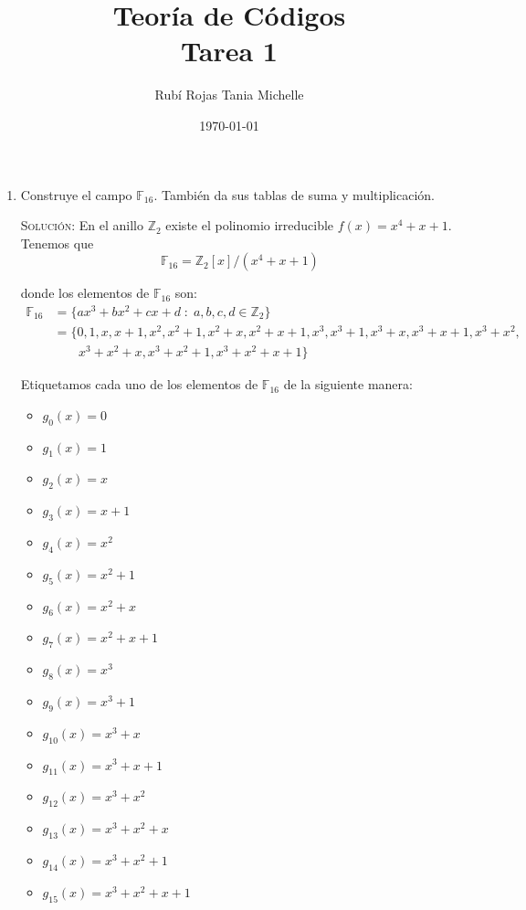 \documentclass[letterpaper,10pt]{article}
\title{Teoría de Códigos \\ Tarea 1}
\author{Rubí Rojas Tania Michelle}
\date{\today}
\begin{document}
\maketitle

\begin{enumerate}
    \item Construye el campo $\mathbb{F}_{16}$. También da sus tablas de suma y 
    multiplicación.
    
    \textsc{Solución:} En el anillo $\mathbb{Z}_{2}$ existe el polinomio 
    irreducible $f(x) = x^{4}+x+1$. Tenemos que 
    \begin{equation}
        \mathbb{F}_{16} = \mathbb{Z}_{2}[x]/(x^{4}+x+1)
    \end{equation}
    
    donde los elementos de $\mathbb{F}_{16}$ son:
    \begin{align*}
        \mathbb{F}_{16} 
        &= \{ax^{3} + bx^{2} + cx + d \; : \; a,b,c,d \in \mathbb{Z}_{2}\} \\
        &= \{0, 1, x, x + 1, x^2, x^2 + 1, x^2 + x, x^2 + x + 1, x^3, 
             x^3 + 1, x^3 + x, x^3 + x + 1, x^3 + x^2, \\ 
        &\; \; \; \; \; \; \; x^3 + x^2 + x, x^3 + x^2 + 1, x^3 + x^2 + x + 1\}
    \end{align*}
    
    Etiquetamos cada uno de los elementos de $\mathbb{F}_{16}$ de la siguiente 
    manera:
    \begin{multicols}{3}
        \begin{itemize}
            \item $g_{0}(x) = 0$
            \item $g_{1}(x) = 1$
            \item $g_{2}(x) = x$
            \item $g_{3}(x) = x+1$
            \item $g_{4}(x) = x^{2}$
            \item $g_{5}(x) = x^{2}+1$
            \item $g_{6}(x) = x^{2}+x$
            \item $g_{7}(x) = x^{2}+x+1$
            \item $g_{8}(x) = x^{3}$
            \item $g_{9}(x) = x^{3}+1$
            \item $g_{10}(x) = x^{3}+x$
            \item $g_{11}(x) = x^{3}+x+1$
            \item $g_{12}(x) = x^{3}+x^{2}$
            \item $g_{13}(x) = x^{3}+x^{2}+x$
            \item $g_{14}(x) = x^{3}+x^{2}+1$
            \item $g_{15}(x) = x^{3}+x^{2}+x+1$
        \end{itemize}
    \end{multicols}


\end{enumerate}
\end{document}
